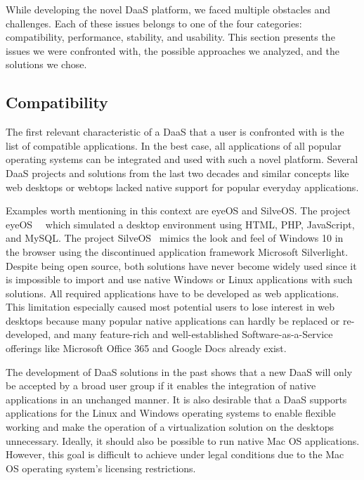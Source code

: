 \documentclass[runningheads]{llncs}
\begin{document}

While developing the novel DaaS platform, we faced multiple obstacles and challenges. Each of these issues belongs to one of the four categories: compatibility, performance, stability, and usability. This section presents the issues we were confronted with, the possible approaches we analyzed, and the solutions we chose.

\subsection{Compatibility}
% 

The first relevant characteristic of a DaaS that a user is confronted with is the list of compatible applications. In the best case, all applications of all popular operating systems can be integrated and used with such a novel platform. Several DaaS projects and solutions from the last two decades and similar concepts like web desktops or webtops lacked native support for popular everyday applications. 

Examples worth mentioning in this context are eyeOS and SilveOS. The project eyeOS~\cite{liu2012research}~\cite{vidyabanu2011implementation} which simulated a desktop environment using HTML, PHP, JavaScript, and MySQL. The project SilveOS~\cite{garmpis2016design} mimics the look and feel of Windows 10 in the browser using the discontinued application framework Microsoft Silverlight. Despite being open source, both solutions have never become widely used since it is impossible to import and use native Windows or Linux applications with such solutions. All required applications have to be developed as web applications. This limitation especially caused most potential users to lose interest in web desktops because many popular native applications can hardly be replaced or re-developed, and many feature-rich and well-established Software-as-a-Service offerings like Microsoft Office 365 and Google Docs already exist.

The development of DaaS solutions in the past shows that a new DaaS will only be accepted by a broad user group if it enables the integration of native applications in an unchanged manner. It is also desirable that a DaaS supports applications for the Linux and Windows operating systems to enable flexible working and make the operation of a virtualization solution on the desktops unnecessary. Ideally, it should also be possible to run native Mac OS applications. However, this goal is difficult to achieve under legal conditions due to the Mac OS operating system's licensing restrictions.
\end{document}
